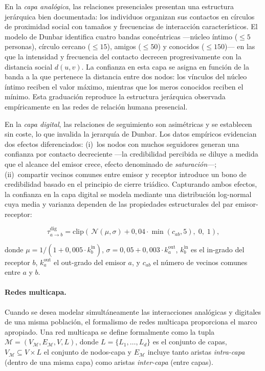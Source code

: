 En la \emph{capa analógica}, las relaciones presenciales presentan una estructura jerárquica bien documentada: los individuos organizan sus contactos en círculos de proximidad social con tamaños y frecuencias de interacción característicos. El modelo de Dunbar \cite{Dunbar1992} identifica cuatro bandas concéntricas —núcleo íntimo ($\leq 5$ personas), círculo cercano ($\leq 15$), amigos ($\leq 50$) y conocidos ($\leq 150$)— en las que la intensidad y frecuencia del contacto decrecen progresivamente con la distancia social $d(u,v)$. La confianza en esta capa se asigna en función de la banda a la que pertenece la distancia entre dos nodos: los vínculos del núcleo íntimo reciben el valor máximo, mientras que los meros conocidos reciben el mínimo. Esta graduación reproduce la estructura jerárquica observada empíricamente en las redes de relación humana presencial.

En la \emph{capa digital}, las relaciones de seguimiento son asimétricas y se establecen sin coste, lo que invalida la jerarquía de Dunbar. Los datos empíricos evidencian dos efectos diferenciados: (i)~los nodos con muchos seguidores generan una confianza por contacto decreciente ---la credibilidad percibida se diluye a medida que el alcance del emisor crece, efecto denominado de \emph{saturación}---; (ii)~compartir vecinos comunes entre emisor y receptor introduce un bono de credibilidad basado en el principio de cierre triádico. Capturando ambos efectos, la confianza en la capa digital se modela mediante una distribución log-normal cuya media y varianza dependen de las propiedades estructurales del par emisor-receptor:

\begin{equation}
  \tau^{\text{dig}}_{a \to b} = \mathrm{clip}\!\left(\,\mathcal{N}(\mu, \sigma) + 0{,}04 \cdot \min(c_{ab}, 5),\; 0,\; 1\right),
  \label{eq:digital-trust}
\end{equation}

donde $\mu = 1 / (1 + 0{,}005 \cdot k_b^{\text{in}})$, $\sigma = 0{,}05 + 0{,}003 \cdot k_a^{\text{out}}$, $k_b^{\text{in}}$ es el in-grado del receptor $b$, $k_a^{\text{out}}$ el out-grado del emisor $a$, y $c_{ab}$ el número de vecinos comunes entre $a$ y $b$.

\paragraph{Redes multicapa.}
Cuando se desea modelar simultáneamente las interacciones analógicas y digitales de una misma población, el formalismo de redes multicapa \cite{Kivela2014, DeDomenico2013} proporciona el marco apropiado. Una red multicapa se define formalmente como la tupla $\mathcal{M} = (V_\mathcal{M}, E_\mathcal{M}, V, L)$, donde $L = \{L_1, \ldots, L_d\}$ es el conjunto de capas, $V_\mathcal{M} \subseteq V \times L$ el conjunto de nodos-capa y $E_\mathcal{M}$ incluye tanto aristas \emph{intra-capa} (dentro de una misma capa) como aristas \emph{inter-capa} (entre capas).

